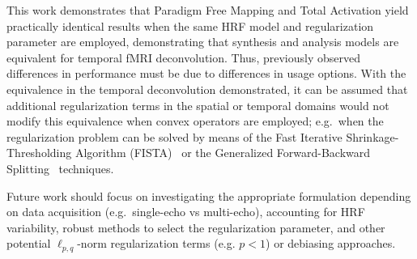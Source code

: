 This work demonstrates that Paradigm Free Mapping and Total Activation yield practically identical results when the same HRF model and regularization parameter are employed, demonstrating that synthesis and analysis models are equivalent for temporal fMRI deconvolution. Thus, previously observed differences in performance must be due to differences in usage options. With the equivalence in the temporal deconvolution demonstrated, it can be assumed that additional regularization terms in the spatial or temporal domains would not modify this equivalence when convex operators are employed; e.g.\ when the regularization problem can be solved by means of the Fast Iterative Shrinkage-Thresholding Algorithm (FISTA)~\cite{beck2009FastIterativeShrinkagethresholding} or the Generalized Forward-Backward Splitting~\cite{raguet2013GeneralizedForwardBackwardSplittinga} techniques.

Future work should focus on investigating the appropriate formulation depending on data acquisition (e.g.\ single-echo vs multi-echo), accounting for HRF variability, robust methods to select the regularization parameter, and other potential \(\ell_{p,q}\)-norm regularization terms (e.g. \(p < 1\)) or debiasing approaches.